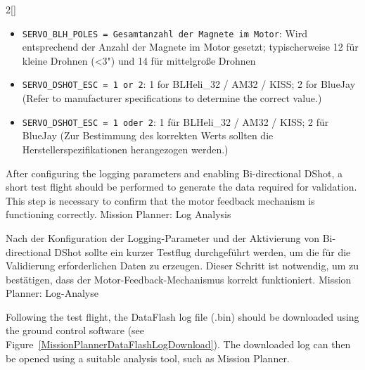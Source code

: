 \begin{paracol}{2}[]
\colger

\begin{itemize}
\item \texttt{SERVO\_BLH\_POLES = Gesamtanzahl der Magnete im Motor}: Wird entsprechend der Anzahl der Magnete im Motor gesetzt; typischerweise 12 für kleine Drohnen (<3") und 14 für mittelgroße Drohnen
\end{itemize}

\coleng

\begin{itemize}
\item \texttt{SERVO\_DSHOT\_ESC = 1 or 2}: 1 for BLHeli\_32 / AM32 / KISS; 2 for BlueJay (Refer to manufacturer specifications to determine the correct value.)
\end{itemize}

\colger

\begin{itemize}
\item \texttt{SERVO\_DSHOT\_ESC = 1 oder 2}: 1 für BLHeli\_32 / AM32 / KISS; 2 für BlueJay (Zur Bestimmung des korrekten Werts sollten die Herstellerspezifikationen herangezogen werden.)
\end{itemize}

\colende

\renewcommand{\deutschertitel}{Validierung von bidirektionalem DShot und RPM-Logging (Optional)}
\renewcommand{\englischertitel}{Validation of Bidirectional DShot and RPM Logging (Optional)}
\makrounterunterabschnitt
\label{MotorFrequenciesReading}

After configuring the logging parameters and enabling Bi-directional DShot, a short test flight should be performed to generate the data required for validation. This step is necessary to confirm that the motor feedback mechanism is functioning correctly.
Mission Planner: Log Analysis

\colger

Nach der Konfiguration der Logging-Parameter und der Aktivierung von Bi-directional DShot sollte ein kurzer Testflug durchgeführt werden, um die für die Validierung erforderlichen Daten zu erzeugen. Dieser Schritt ist notwendig, um zu bestätigen, dass der Motor-Feedback-Mechanismus korrekt funktioniert.
Mission Planner: Log-Analyse

\coleng

Following the test flight, the DataFlash log file (.bin) should be downloaded using the ground control software (see Figure~\ref{MissionPlannerDataFlashLogDownload}). The downloaded log can then be opened using a suitable analysis tool, such as Mission Planner.


\end{paracol}
